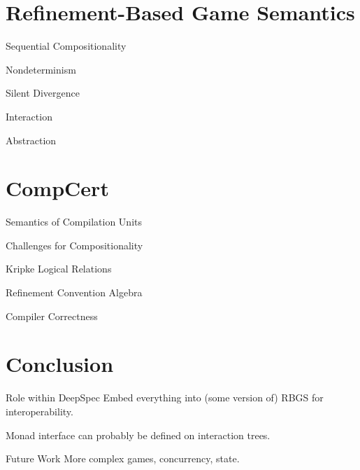 \documentclass{beamer}
\begin{document}
\section{Refinement-Based Game Semantics}

\begin{frame}{Sequential Compositionality} %
\end{frame}

\begin{frame}{Nondeterminism} %
\end{frame}

\begin{frame}{Silent Divergence} %
\end{frame}

\begin{frame}{Interaction} %
\end{frame}

\begin{frame}{Abstraction} %
\end{frame}

\section{CompCert}

\begin{frame}{Semantics of Compilation Units} %
\end{frame}

\begin{frame}{Challenges for Compositionality} %
\end{frame}

\begin{frame}{Kripke Logical Relations} %
\end{frame}

\begin{frame}{Refinement Convention Algebra} %
\end{frame}

\begin{frame}{Compiler Correctness} %
\end{frame}

\section{Conclusion}

\begin{frame}{Role within DeepSpec} %
Embed everything into (some version of) RBGS for interoperability.

Monad interface can probably be defined on interaction trees.
\end{frame}

\begin{frame}{Future Work} %
More complex games, concurrency, state.
\end{frame}
\end{document}
